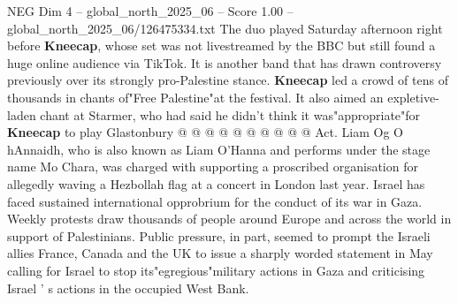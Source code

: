 \begin{textsample}{NEG Dim 4 – global\_north\_2025\_06 – Score 1.00 – global\_north\_2025\_06/126475334.txt}
The duo played Saturday afternoon right before \textbf{Kneecap}, whose set was not livestreamed by the BBC but still found a huge online audience via TikTok.
It is another band that has drawn controversy previously over its strongly pro-Palestine stance. \textbf{Kneecap} led a crowd of tens of thousands in chants of"Free Palestine"at the festival.
It also aimed an expletive-laden chant at Starmer, who had said he didn't think it was"appropriate"for \textbf{Kneecap} to play Glastonbury @ @ @ @ @ @ @ @ @ @ Act.
Liam Og O hAnnaidh, who is also known as Liam O'Hanna and performs under the stage name Mo Chara, was charged with supporting a proscribed organisation for allegedly waving a Hezbollah flag at a concert in London last year.
Israel has faced sustained international opprobrium for the conduct of its war in Gaza.
Weekly protests draw thousands of people around Europe and across the world in support of Palestinians.
Public pressure, in part, seemed to prompt the Israeli allies France, Canada and the UK to issue a sharply worded statement in May calling for Israel to stop its"egregious"military actions in Gaza and criticising Israel ' s actions in the occupied West Bank.

\end{textsample}
